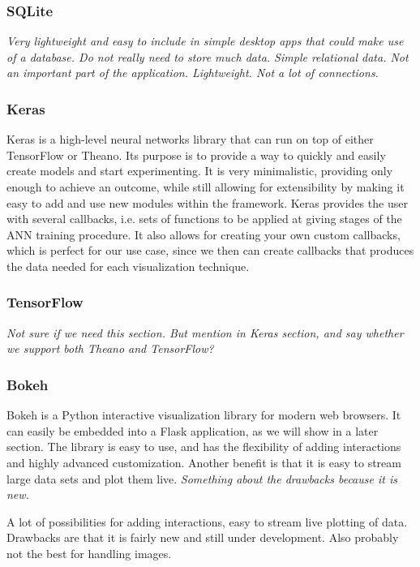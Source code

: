 \subsubsection{SQLite}

\textit{Very lightweight and easy to include in simple desktop apps that could make use of a database. Do not really need to store much data. Simple relational data. Not an important part of the application. Lightweight. Not a lot of connections.}

\subsubsection{Keras}

Keras is a high-level neural networks library that can run on top of either TensorFlow or Theano. Its purpose is to provide a way to quickly and easily create models and start experimenting. It is very minimalistic, providing only enough to achieve an outcome, while still allowing for extensibility by making it easy to add and use new modules within the framework. Keras provides the user with several callbacks, i.e. sets of functions to be applied at giving stages of the ANN training procedure. It also allows for creating your own custom callbacks, which is perfect for our use case, since we then can create callbacks that produces the data needed for each visualization technique.

\subsubsection{TensorFlow}

\textit{Not sure if we need this section. But mention in Keras section, and say whether we support both Theano and TensorFlow?}

\subsubsection{Bokeh}

Bokeh is a Python interactive visualization library for modern web browsers. It can easily be embedded into a Flask application, as we will show in a later section. The library is easy to use, and has the flexibility of adding interactions and highly advanced customization. Another benefit is that it is easy to stream large data sets and plot them live. \textit{Something about the drawbacks because it is new.}

A lot of possibilities for adding interactions, easy to stream live plotting of data. Drawbacks are that it is fairly new and still under development. Also probably not the best for handling images.

